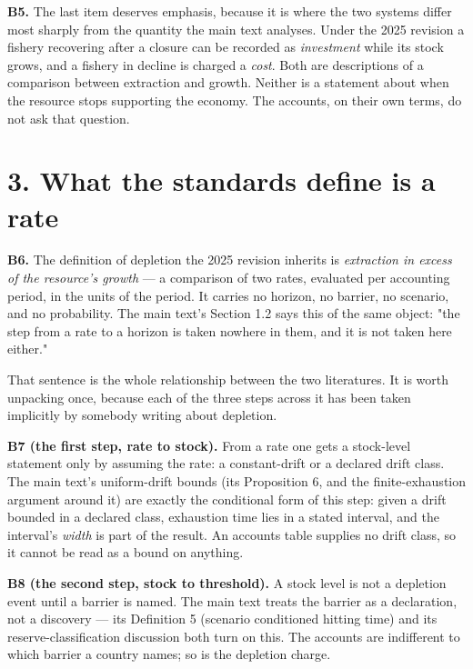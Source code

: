 \documentclass[11pt]{article}
\begin{document}
\textbf{B5.} The last item deserves emphasis, because it is where the two systems differ most sharply from the quantity the main text analyses. Under the 2025 revision a fishery recovering after a closure can be recorded as \emph{investment} while its stock grows, and a fishery in decline is charged a \emph{cost}. Both are descriptions of a comparison between extraction and growth. Neither is a statement about when the resource stops supporting the economy. The accounts, on their own terms, do not ask that question.

\vspace{0.8em}

\section*{3. What the standards define is a rate}\label{3-what-the-standards-define-is-a-rate}

\textbf{B6.} The definition of depletion the 2025 revision inherits is \emph{extraction in excess of the resource's growth} --- a comparison of two rates, evaluated per accounting period, in the units of the period. It carries no horizon, no barrier, no scenario, and no probability. The main text's Section 1.2 says this of the same object: "the step from a rate to a horizon is taken nowhere in them, and it is not taken here either."

That sentence is the whole relationship between the two literatures. It is worth unpacking once, because each of the three steps across it has been taken implicitly by somebody writing about depletion.

\textbf{B7 (the first step, rate to stock).} From a rate one gets a stock-level statement only by assuming the rate: a constant-drift or a declared drift class. The main text's uniform-drift bounds (its Proposition 6, and the finite-exhaustion argument around it) are exactly the conditional form of this step: given a drift bounded in a declared class, exhaustion time lies in a stated interval, and the interval's \emph{width} is part of the result. An accounts table supplies no drift class, so it cannot be read as a bound on anything.

\textbf{B8 (the second step, stock to threshold).} A stock level is not a depletion event until a barrier is named. The main text treats the barrier as a declaration, not a discovery --- its Definition 5 (scenario conditioned hitting time) and its reserve-classification discussion both turn on this. The accounts are indifferent to which barrier a country names; so is the depletion charge.
\end{document}
